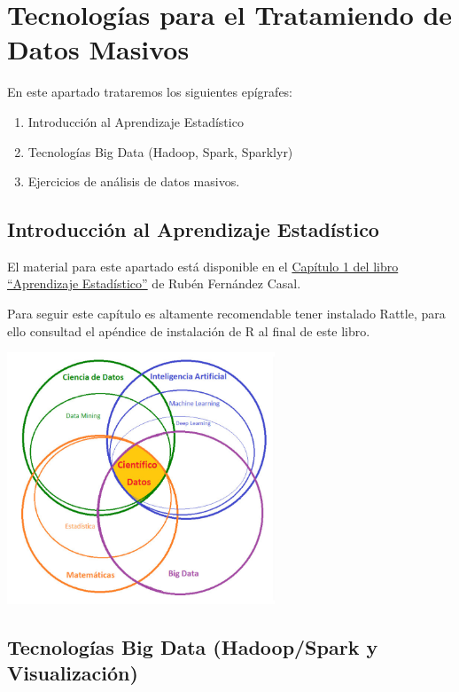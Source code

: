 \documentclass[
]{book}
\begin{document}
\chapter{Tecnologías para el Tratamiendo de Datos Masivos}\label{tecnologuxedas-para-el-tratamiendo-de-datos-masivos}

En este apartado trataremos los siguientes epígrafes:

\begin{enumerate}
\def\labelenumi{\arabic{enumi}.}
\item
  Introducción al Aprendizaje Estadístico
\item
  Tecnologías Big Data (Hadoop, Spark, Sparklyr)
\item
  Ejercicios de análisis de datos masivos.
\end{enumerate}

\section{Introducción al Aprendizaje Estadístico}\label{introducciuxf3n-al-aprendizaje-estaduxedstico}

El material para este apartado está disponible en el
\href{https://rubenfcasal.github.io/aprendizaje_estadistico/intro-AE.html}{Capítulo 1 del libro ``Aprendizaje Estadístico''} de Rubén Fernández Casal.

Para seguir este capítulo es altamente recomendable tener instalado Rattle, para ello consultad el apéndice de instalación de R al final de este libro.

\includegraphics[width=0.6\textwidth,height=\textheight]{images/T3-CientificoDatos.png}

\section{Tecnologías Big Data (Hadoop/Spark y Visualización)}\label{tecnologuxedas-big-data-hadoopspark-y-visualizaciuxf3n}
\end{document}
